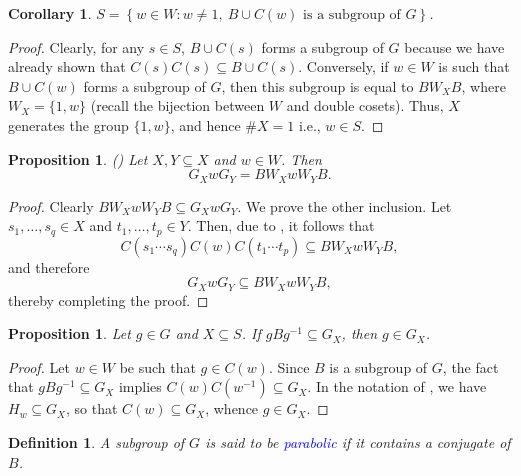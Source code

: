 \documentclass{article}
\theoremstyle{thmstyle}
\newtheorem{proposition}[theorem]{Proposition}
\theoremstyle{defstyle}
\newtheorem{definition}[theorem]{Definition}
\newtheorem{corollary}[theorem]{Corollary}
\newcommand{\define}[1]{\textcolor{blue}{\textit{#1}}}
\begin{document}
\begin{corollary}
    $S = \left\{w\in W\colon w\ne 1,~B\cup C(w)\text{ is a subgroup of }G\right\}$.
\end{corollary}
\begin{proof}
    Clearly, for any $s\in S$, $B\cup C(s)$ forms a subgroup of $G$ because we have already shown that $C(s)C(s)\subseteq B\cup C(s)$. Conversely, if $w\in W$ is such that $B\cup C(w)$ forms a subgroup of $G$, then this subgroup is equal to $BW_XB$, where $W_X = \{1, w\}$ (recall the bijection between $W$ and double cosets). Thus, $X$ generates the group $\{1, w\}$, and hence $\# X = 1$ i.e., $w\in S$.
\end{proof}

\begin{proposition}\big(\cite[2.3.5]{macdonald-spherical-functions}\big)
    Let $X, Y\subseteq X$ and $w\in W$. Then
    \begin{equation*}
        G_X w G_Y = BW_XwW_YB.
    \end{equation*}
\end{proposition}
\begin{proof}
    Clearly $BW_XwW_YB\subseteq G_XwG_Y$. We prove the other inclusion. Let $s_1,\dots,s_q\in X$ and $t_1,\dots,t_p\in Y$. Then, due to , it follows that 
    \begin{equation*}
        C(s_1\cdots s_q)C(w)C(t_1\cdots t_p)\subseteq BW_XwW_YB,
    \end{equation*}
    and therefore 
    \begin{equation*}
        G_XwG_Y\subseteq BW_XwW_YB,
    \end{equation*}
    thereby completing the proof.
\end{proof}

\begin{proposition}
    Let $g\in G$ and $X\subseteq S$. If $gBg^{-1}\subseteq G_X$, then $g\in G_X$.
\end{proposition}
\begin{proof}
    Let $w\in W$ be such that $g\in C(w)$. Since $B$ is a subgroup of $G$, the fact that $gBg^{-1}\subseteq G_X$ implies $C(w)C(w^{-1})\subseteq G_X$. In the notation of , we have $H_w\subseteq G_X$, so that $C(w)\subseteq G_X$, whence $g\in G_X$.
\end{proof}

\begin{definition}
    A subgroup of $G$ is said to be \define{parabolic} if it contains a conjugate of $B$.
\end{definition}
\end{document}
